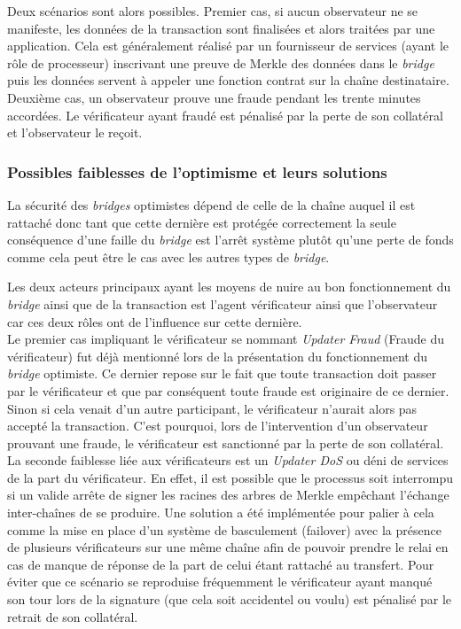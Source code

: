 Deux scénarios sont alors possibles. Premier cas, si aucun observateur ne se manifeste, les données de la transaction sont finalisées et alors traitées par une application. Cela est généralement réalisé par un fournisseur de services (ayant le rôle de processeur) inscrivant une preuve de Merkle des données dans le \textit{bridge} puis les données servent à appeler une fonction contrat sur la chaîne destinataire. Deuxième cas, un observateur prouve une fraude pendant les trente minutes accordées. Le vérificateur ayant fraudé est pénalisé par la perte de son collatéral et l’observateur le reçoit.

\subsubsection{Possibles faiblesses de l’optimisme et leurs solutions}

La sécurité des \textit{bridges} optimistes dépend de celle de la chaîne auquel il est rattaché donc tant que cette dernière est protégée correctement la seule conséquence d’une faille du \textit{bridge} est l’arrêt système plutôt qu’une perte de fonds comme cela peut être le cas avec les autres types de \textit{bridge}.

Les deux acteurs principaux ayant les moyens de nuire au bon fonctionnement du \textit{bridge} ainsi que de la transaction est l’agent vérificateur ainsi que l’observateur car ces deux rôles ont de l’influence sur cette dernière. \\

Le premier cas impliquant le vérificateur se nommant \textit{Updater Fraud} (Fraude du vérificateur)  fut déjà mentionné lors de la présentation du fonctionnement du \textit{bridge} optimiste. Ce dernier repose sur le fait que toute transaction doit passer par le vérificateur et que par conséquent toute fraude est originaire de ce dernier. Sinon si cela venait d’un autre participant, le vérificateur n’aurait alors pas accepté la transaction. C’est pourquoi, lors de l’intervention d’un observateur prouvant une fraude, le vérificateur est sanctionné par la perte de son collatéral. \\

La seconde faiblesse liée aux vérificateurs est un \textit{Updater DoS} ou déni de services de la part du vérificateur. En effet, il est possible que le processus soit interrompu si un valide arrête de signer les racines des arbres de Merkle empêchant l'échange inter-chaînes de se produire.
Une solution a été implémentée pour palier à cela comme la mise en place d’un système de basculement (failover) avec la présence de plusieurs vérificateurs sur une même chaîne afin de pouvoir prendre le relai en cas de manque de réponse de la part de celui étant rattaché au transfert.  Pour éviter que ce scénario se reproduise fréquemment le vérificateur ayant manqué son tour lors de la signature (que cela soit accidentel ou voulu) est pénalisé par le retrait de son collatéral. \\

